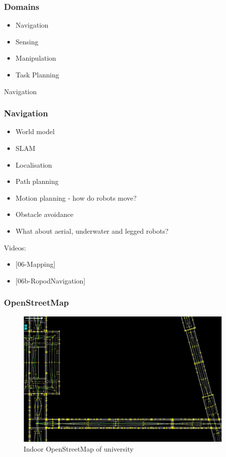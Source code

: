 \documentclass{beamer}
\begin{document}
\begin{frame}
\frametitle{Domains}
\begin{itemize}
    \item Navigation
    \item Sensing
    \item Manipulation
    \item Task Planning
\end{itemize}
\end{frame}

\begin{frame}[standout]
     Navigation
\end{frame}


\begin{frame}
\frametitle{Navigation}
\begin{itemize}
    \item <1->World model
    \item <2->SLAM
    \item <3->Localisation
    \item <4->Path planning
    \item <5->Motion planning - how do robots move?
    \item <6->Obstacle avoidance
    \item <7->What about aerial, underwater and legged robots?
\end{itemize}

{\footnotesize
Videos:
\begin{itemize}
\item <2->{[06-Mapping]}
\item <3->{[06b-RopodNavigation]}
\end{itemize}}
\end{frame}

\begin{frame}
\frametitle{OpenStreetMap}
\begin{figure}[H]
     \centering
     \includegraphics[width=0.95\textwidth]{images/OSM.png}
     \caption{Indoor OpenStreetMap of university~\cite{Naik2019}}
     \label{fig:pick}
\end{figure}
\end{frame}
\end{document}
